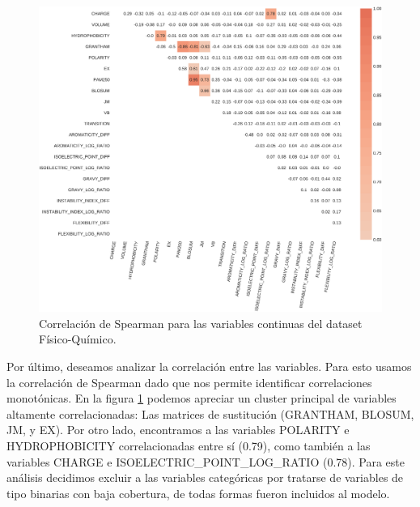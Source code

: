 \begin{figure}[H]
    \centering
    \includegraphics[scale=0.25]{documents/latex/figures/3/structural/structural_corr.pdf}
    \caption{Correlación de Spearman para las variables continuas del dataset Físico-Químico.}
    \label{fig:corrplot_structural}
\end{figure}

Por último, deseamos analizar la correlación entre las variables. Para esto usamos la correlación de Spearman dado que nos permite identificar correlaciones monotónicas. En la figura \ref{fig:corrplot_structural} podemos apreciar un cluster principal de variables altamente correlacionadas: Las matrices de sustitución (GRANTHAM, BLOSUM, JM, y EX). Por otro lado, encontramos a las variables POLARITY e HYDROPHOBICITY correlacionadas entre sí (0.79), como también a las variables CHARGE e ISOELECTRIC\_POINT\_LOG\_RATIO (0.78). Para este análisis decidimos excluir a las variables categóricas por tratarse de variables de tipo binarias con baja cobertura, de todas formas fueron incluidos al modelo.  





